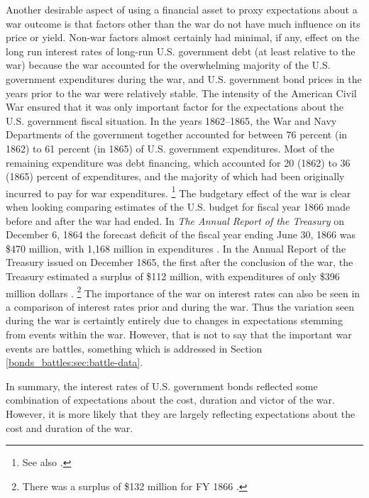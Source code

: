 Another desirable aspect of using a financial asset to proxy expectations about a war outcome is that factors other than the war do not have much influence on its price or yield.
Non-war factors almost certainly had minimal, if any, effect on the long run interest rates of long-run U.S. government debt (at least relative to the war) because the war accounted for the overwhelming majority of the U.S. government expenditures during the war, and U.S. government bond prices in the years prior to the war were relatively stable.
The intensity of the American Civil War ensured that it was only important factor for the expectations about the U.S. government fiscal situation.
In the years 1862--1865, the War and Navy Departments of the government together accounted for between 76 percent (in 1862) to 61 percent (in 1865) of U.S. government expenditures.
Most of the remaining expenditure was debt financing, which accounted for 20 (1862) to 36 (1865) percent of expenditures, and the majority of which had been originally incurred to pay for war expenditures.%
\footnote{See also \textcite[][14]{Godfrey1976}.}
The budgetary effect of the war is clear when looking comparing estimates of the U.S. budget for fiscal year 1866 made before and after the war had ended.
In \textit{The Annual Report of the  Treasury} on December 6, 1864 the forecast deficit of the fiscal year ending June 30, 1866 was \$470 million, with 1,168 million in expenditures \parencite[13][]{Treasury1864}.
In the Annual Report of the Treasury issued on December 1865, the first after the conclusion of the war, the Treasury estimated a surplus of \$112 million, with expenditures of only \$396 million dollars \parencite{Treasury1865}.%
\footnote{There was a surplus of \$132 million for FY 1866 \parencite[2][]{Treasury1866}.}
The importance of the war on interest rates can also be seen in a comparison of interest rates prior and during the war.
Thus the variation seen during the war is certaintly entirely due to changes in expectations stemming from events within the war.
However, that is not to say that the important war events are battles, something which is addressed in Section \ref{bonds_battles:sec:battle-data}.

In summary, the interest rates of U.S. government bonds reflected some combination of expectations about the cost, duration and victor of the war.
However, it is more likely that they are largely reflecting expectations about the cost and duration of the war.

